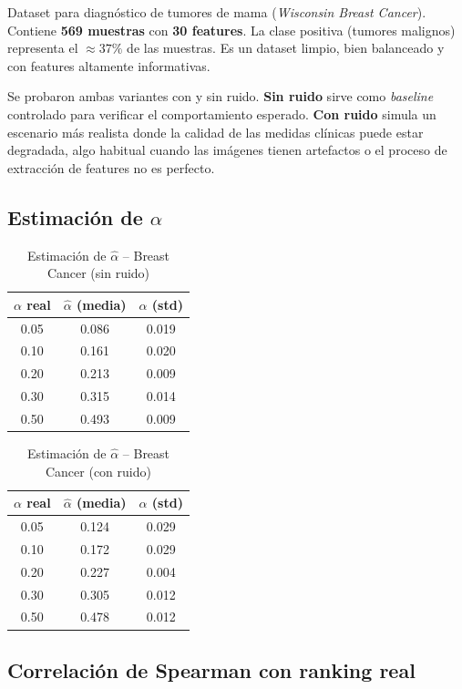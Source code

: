 \documentclass[a4paper,11pt]{article}
\begin{document}
Dataset para diagnóstico de tumores de mama (\textit{Wisconsin Breast Cancer}). Contiene \textbf{569 muestras} con \textbf{30 features}. La clase positiva (tumores malignos) representa el $\approx 37\%$ de las muestras. Es un dataset limpio, bien balanceado y con features altamente informativas.

Se probaron ambas variantes con y sin ruido. \textbf{Sin ruido} sirve como \textit{baseline} controlado para verificar el comportamiento esperado. \textbf{Con ruido} simula un escenario más realista donde la calidad de las medidas clínicas puede estar degradada, algo habitual cuando las imágenes tienen artefactos o el proceso de extracción de features no es perfecto.

\subsection{Estimación de $\alpha$}

\begin{table}[H]
\centering
\caption{Estimación de $\hat{\alpha}$ -- Breast Cancer (sin ruido)}
\begin{tabular}{ccc}
\toprule
$\alpha$ real & $\hat{\alpha}$ (media) & $\hat{\alpha}$ (std) \\
\midrule
0.05 & 0.086 & 0.019 \\
0.10 & 0.161 & 0.020 \\
0.20 & 0.213 & 0.009 \\
0.30 & 0.315 & 0.014 \\
0.50 & 0.493 & 0.009 \\
\bottomrule
\end{tabular}
\end{table}

\begin{table}[H]
\centering
\caption{Estimación de $\hat{\alpha}$ -- Breast Cancer (con ruido)}
\begin{tabular}{ccc}
\toprule
$\alpha$ real & $\hat{\alpha}$ (media) & $\hat{\alpha}$ (std) \\
\midrule
0.05 & 0.124 & 0.029 \\
0.10 & 0.172 & 0.029 \\
0.20 & 0.227 & 0.004 \\
0.30 & 0.305 & 0.012 \\
0.50 & 0.478 & 0.012 \\
\bottomrule
\end{tabular}
\end{table}

\subsection{Correlación de Spearman con ranking real}
\end{document}
